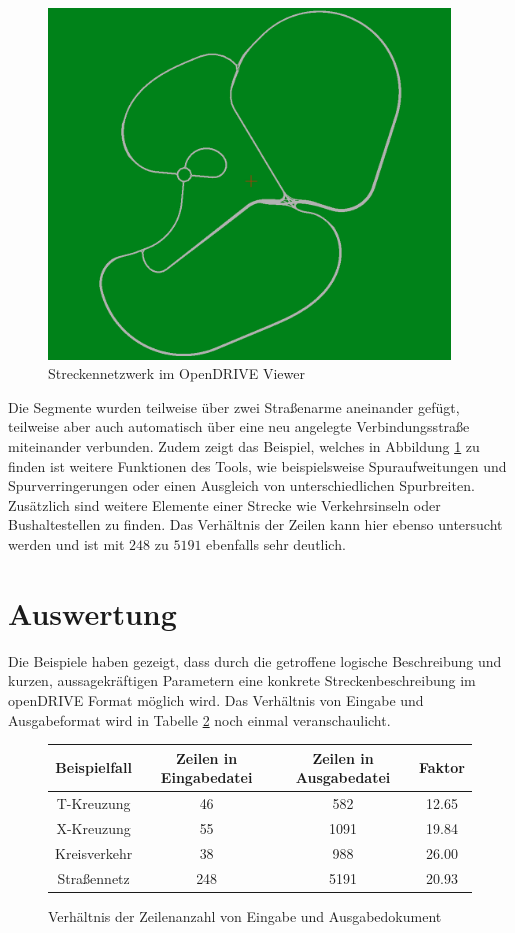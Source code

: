 \begin{figure}[H]
\flushleft
\includegraphics[width=0.95\textwidth]{fig/fig8.png}
\caption{Streckennetzwerk im OpenDRIVE Viewer}
\label{abb9}
\end{figure}

Die Segmente wurden teilweise über zwei Straßenarme aneinander gefügt, teilweise aber auch automatisch über eine neu angelegte Verbindungsstraße miteinander verbunden. Zudem zeigt das Beispiel, welches in Abbildung \ref{abb9} zu finden ist weitere Funktionen des Tools, wie beispielsweise Spuraufweitungen und Spurverringerungen oder einen Ausgleich von unterschiedlichen Spurbreiten. Zusätzlich sind weitere Elemente einer Strecke wie Verkehrsinseln oder Bushaltestellen zu finden. Das Verhältnis der Zeilen kann hier ebenso untersucht werden und ist mit \(248\) zu \(5191\) ebenfalls sehr deutlich.

\section{Auswertung}

Die Beispiele haben gezeigt, dass durch die getroffene logische Beschreibung und kurzen, aussagekräftigen Parametern eine konkrete Streckenbeschreibung im openDRIVE Format möglich wird. Das Verhältnis von Eingabe und Ausgabeformat wird in Tabelle \ref{tab1} noch einmal veranschaulicht.
\begin{figure}
    \centering
    \begin{tabular}{c|c|c|c}
        \toprule
        \textbf{Beispielfall} & Zeilen in Eingabedatei & Zeilen in Ausgabedatei & Faktor \\
        \midrule
        T-Kreuzung   & 46 & 582  & 12.65\\
        X-Kreuzung   & 55 & 1091 & 19.84\\
        Kreisverkehr & 38 & 988 & 26.00\\
        Straßennetz  & 248 & 5191 & 20.93 \\
        \bottomrule
    \end{tabular}            
    \caption{Verhältnis der Zeilenanzahl von Eingabe und Ausgabedokument}
    \label{tab1}
\end{figure}

